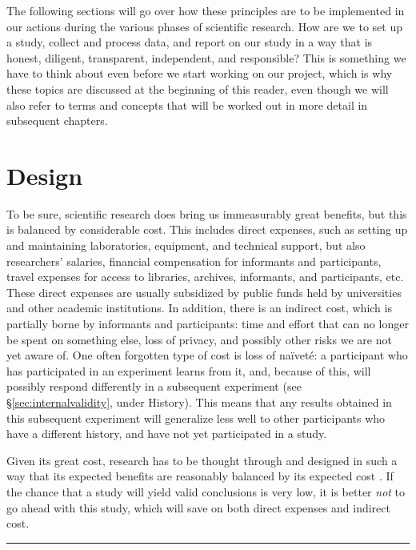 \documentclass[
]{book}
\begin{document}
The following sections will go over how these principles are to be implemented in our actions during the various phases of scientific research. How are we to set up a study, collect and process data, and report on our study in a way that is honest, diligent, transparent, independent, and responsible? This is something we have to think about even before we start working on our project, which is why these topics are discussed at the beginning of this reader, even though we will also refer to terms and concepts that will be worked out in more detail in subsequent chapters.

\section{Design}\label{sec:design}

To be sure, scientific research does bring us immeasurably great benefits, but this is balanced by considerable cost. This includes direct expenses, such as setting up and maintaining laboratories, equipment, and technical support, but also researchers' salaries, financial compensation for informants and participants, travel expenses for access to libraries, archives, informants, and participants, etc. These direct expenses are usually subsidized by public funds held by universities and other academic institutions. In addition, there is an indirect cost, which is partially borne by informants and participants: time and effort that can no longer be spent on something else, loss of privacy, and possibly other risks we are not yet aware of. One often forgotten type of cost is loss of naïveté: a participant who has participated in an experiment learns from it, and, because of this, will possibly respond differently in a subsequent experiment (see §\ref{sec:internalvalidity}, under History). This means that any results obtained in this subsequent experiment will generalize less well to other participants who have a different history, and have not yet participated in a study.

Given its great cost, research has to be thought through and designed in such a way that its expected benefits are reasonably balanced by its expected cost \citep[Ch.3]{Rose08}. If the chance that a study will yield valid conclusions is very low, it is better \emph{not} to go ahead with this study, which will save on both direct expenses and indirect cost.

\begin{center}\rule{0.5\linewidth}{0.5pt}\end{center}
\end{document}
